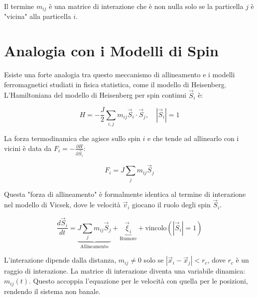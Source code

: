 Il termine $m_{ij}$ è una matrice di interazione che è non nulla solo se la particella $j$ è "vicina" alla particella $i$.


\section{Analogia con i Modelli di Spin}
Esiste una forte analogia tra questo meccanismo di allineamento e i modelli ferromagnetici studiati in fisica statistica, come il modello di Heisenberg. L'Hamiltoniana del modello di Heisenberg per spin continui $\vec{S}_i$ è:

\begin{equation} \label{eq:ch27_14}
H = -\frac{J}{2}\sum_{i,j}m_{ij}\vec{S}_i \cdot \vec{S}_j, \quad |\vec{S}_i|=1
\end{equation}

La forza termodinamica che agisce sullo spin $i$ e che tende ad allinearlo con i vicini è data da $F_i = -\frac{\partial H}{\partial \vec{S}_i}$:

\begin{equation} \label{eq:ch27_15}
F_i = J\sum_{j}m_{ij}\vec{S}_j
\end{equation}

Questa "forza di allineamento" è formalmente identica al termine di interazione nel modello di Vicsek, dove le velocità $\vec{v}_i$ giocano il ruolo degli spin $\vec{S}_i$.

\begin{equation} \label{eq:ch27_16}
\frac{d\vec{S}_i}{dt} = \underbrace{J\sum_{j}m_{ij}\vec{S}_j}_{\text{Allineamento}} + \underbrace{\vec{\xi}_i}_{\text{Rumore}} + \text{vincolo}(|\vec{S}_i|=1)
\end{equation}

\vspace{0.5cm}
\noindent{}
\vspace{0.5cm}

L'interazione dipende dalla distanza, $m_{ij} \neq 0$ solo se $|\vec{x}_i - \vec{x}_j| < r_c$, dove $r_c$ è un raggio di interazione. La matrice di interazione diventa una variabile dinamica: $m_{ij}(t)$. Questo accoppia l'equazione per le velocità con quella per le posizioni, rendendo il sistema non banale.


